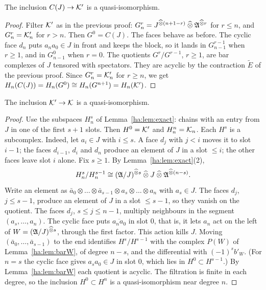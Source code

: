 \begin{proposition}\label{ha:prop:stepA}
The inclusion \(C(J)\to\mathcal K'\) is a quasi-isomorphism.
\end{proposition}

\begin{proof}
Filter \(\mathcal K'\) as in the previous proof: \(G^r_n=J^{\mathbin{\widehat\otimes}(n+1-r)}\mathbin{\widehat\otimes}
\mathfrak A^{\mathbin{\widehat\otimes} r}\) for \(r\le n\), and \(G^r_n=\mathcal K'_n\) for \(r>n\). Then
\(G^0=C(J)\). The faces behave as before. The cyclic face \(d_n\) puts
\(a_na_0\in J\) in front and keeps the block, so it lands in
\(G^{r-1}_{n-1}\) when \(r\ge1\), and in \(G^0_{n-1}\) when \(r=0\). The
quotients \(G^r/G^{r-1}\), \(r\ge1\), are bar complexes of \(J\) tensored
with spectators. They are acyclic by the contraction \(\tilde E\) of the
previous proof. Since \(G^r_n=\mathcal K'_n\) for \(r\ge n\), we get
\(H_n(C(J))=H_n(G^0)\cong H_n(G^{n+1})=H_n(\mathcal K')\).
\end{proof}

\begin{proposition}\label{ha:prop:stepB}
The inclusion \(\mathcal K'\to\mathcal K\) is a quasi-isomorphism.
\end{proposition}

\begin{proof}
Use the subspaces \(H^s_n\) of Lemma~\ref{ha:lem:exact}: chains with an
entry from \(J\) in one of the first \(s+1\) slots. Then \(H^0=\mathcal K'\) and
\(H^n_n=\mathcal K_n\). Each \(H^s\) is a subcomplex. Indeed, let \(a_i\in J\)
with \(i\le s\). A face \(d_j\) with \(j<i\) moves it to slot \(i-1\); the
faces \(d_{i-1}\), \(d_i\) and \(d_n\) produce an element of \(J\) in a
slot \(\le i\); the other faces leave slot \(i\) alone. Fix \(s\ge1\). By
Lemma~\ref{ha:lem:exact}(2),
\[
 H^s_n/H^{s-1}_n\cong(\mathfrak A/J)^{\mathbin{\widehat\otimes} s}\mathbin{\widehat\otimes} J\mathbin{\widehat\otimes}\mathfrak A^{\mathbin{\widehat\otimes}(n-s)} .
\]
Write an element as \(\bar a_0\otimes\dots\otimes\bar a_{s-1}\otimes a_s
\otimes\dots\otimes a_n\) with \(a_s\in J\). The faces \(d_j\), \(j\le
s-1\), produce an element of \(J\) in a slot \(\le s-1\), so they vanish
on the quotient. The faces \(d_j\), \(s\le j\le n-1\), multiply
neighbours in the segment \((a_s,\dots,a_n)\). The cyclic face puts
\(\overline{a_na_0}\) in slot \(0\), that is, it lets \(a_n\) act on the
left of \(W=(\mathfrak A/J)^{\mathbin{\widehat\otimes} s}\), through the first factor. This action
kills \(J\). Moving \((\bar a_0,\dots,\bar a_{s-1})\) to the end
identifies \(H^s/H^{s-1}\) with the complex \(P(W)\) of
Lemma~\ref{ha:lem:barW}, of degree \(n-s\), and the differential with
\((-1)^sb'_W\). (For \(n=s\) the cyclic face gives \(a_sa_0\in J\) in slot
\(0\), which lies in \(H^0\subset H^{s-1}\).) By Lemma~\ref{ha:lem:barW} each
quotient is acyclic. The filtration is finite in each degree, so the
inclusion \(H^0\subset H^n\) is a quasi-isomorphism near degree \(n\).
\end{proof}


